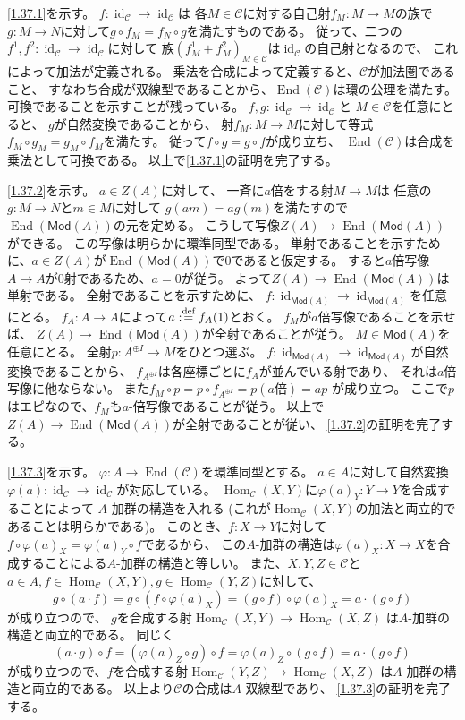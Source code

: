 \documentclass[uplatex,dvipdfmx]{jsarticle}
\makeatletter
\theoremstyle{definition}
\renewenvironment{proof}[1][\proofname]{
  \pushQED{\qed}%
  \normalfont \topsep6\p@\@plus6\p@\relax
  \trivlist
  \item[\hskip\labelsep
    #1\@addpunct{\textbf{.}}]\ignorespaces
}{%
  \popQED\endtrivlist\@endpefalse
}
\providecommand{\proofname}{証明}
\DeclareMathOperator{\Hom}{\mathrm{Hom}}
\DeclareMathOperator{\End}{\mathrm{End}}
\DeclareMathOperator{\id}{\mathrm{id}}
\newcommand{\Mod}{\mathsf{Mod}}
\newcommand\mcC{\mathcal{C}}
\def\dfn{:\overset{\mbox{{\scriptsize def}}}{=}}
\makeatother
\begin{document}
\begin{proof}
  \ref{1.37.1}を示す。
  \(f:\id_{\mcC}\to \id_{\mcC}\)は
  各\(M\in \mcC\)に対する自己射\(f_M:M\to M\)の族で
  \(g:M\to N\)に対して\(g\circ f_M = f_N\circ g\)を満たすものである。
  従って、二つの\(f^1,f^2:\id_{\mcC}\to \id_{\mcC}\)に対して
  族\((f^1_M+f^2_M)_{M\in \mcC}\)は\(\id_{\mcC}\)の自己射となるので、
  これによって加法が定義される。
  乗法を合成によって定義すると、\(\mcC\)が加法圏であること、
  すなわち合成が双線型であることから、\(\End(\mcC)\)は環の公理を満たす。
  可換であることを示すことが残っている。
  \(f,g:\id_{\mcC}\to \id_{\mcC}\)と
  \(M\in \mcC\)を任意にとると、
  \(g\)が自然変換であることから、
  射\(f_M:M\to M\)に対して等式\(f_M\circ g_M = g_M\circ f_M\)を満たす。
  従って\(f\circ g = g\circ f\)が成り立ち、
  \(\End(\mcC)\)は合成を乗法として可換である。
  以上で\ref{1.37.1}の証明を完了する。

  \ref{1.37.2}を示す。
  \(a\in Z(A)\)に対して、
  一斉に\(a\)倍をする射\(M\to M\)は
  任意の\(g:M\to N\)と\(m\in M\)に対して
  \(g(am) = ag(m)\)を満たすので
  \(\End(\Mod(A))\)の元を定める。
  こうして写像\(Z(A)\to \End(\Mod(A))\)ができる。
  この写像は明らかに環準同型である。
  単射であることを示すために、\(a\in Z(A)\)が\(\End(\Mod(A))\)で\(0\)であると仮定する。
  すると\(a\)倍写像\(A\to A\)が\(0\)射であるため、\(a=0\)が従う。
  よって\(Z(A)\to \End(\Mod(A))\)は単射である。
  全射であることを示すために、
  \(f:\id_{\Mod(A)}\to \id_{\Mod(A)}\)を任意にとる。
  \(f_A:A\to A\)によって\(a\dfn f_A(1)\)とおく。
  \(f_M\)が\(a\)倍写像であることを示せば、
  \(Z(A)\to \End(\Mod(A))\)が全射であることが従う。
  \(M\in \Mod(A)\)を任意にとる。
  全射\(p:A^{\oplus I}\to M\)をひとつ選ぶ。
  \(f:\id_{\Mod(A)}\to \id_{\Mod(A)}\)が自然変換であることから、
  \(f_{A^{\oplus I}}\)は各座標ごとに\(f_A\)が並んでいる射であり、
  それは\(a\)倍写像に他ならない。
  また\(f_M\circ p = p\circ f_{A^{\oplus I}} = p(a\text{倍}) = ap\)
  が成り立つ。
  ここで\(p\)はエピなので、\(f_M\)も\(a\)-倍写像であることが従う。
  以上で\(Z(A)\to \End(\Mod(A))\)が全射であることが従い、
  \ref{1.37.2}の証明を完了する。

  \ref{1.37.3}を示す。
  \(\varphi:A\to \End(\mcC)\)を環準同型とする。
  \(a\in A\)に対して自然変換\(\varphi(a):\id_{\mcC}\to \id_{\mcC}\)が対応している。
  \(\Hom_{\mcC}(X,Y)\)に\(\varphi(a)_Y:Y\to Y\)を合成することによって
  \(A\)-加群の構造を入れる
  (これが\(\Hom_{\mcC}(X,Y)\)の加法と両立的であることは明らかである)。
  このとき、\(f:X\to Y\)に対して
  \(f\circ \varphi(a)_X = \varphi(a)_Y\circ f\)であるから、
  この\(A\)-加群の構造は\(\varphi(a)_X:X\to X\)を合成することによる\(A\)-加群の構造と等しい。
  また、\(X,Y,Z\in \mcC\)と
  \(a\in A, f\in \Hom_{\mcC}(X,Y), g\in \Hom_{\mcC}(Y,Z)\)に対して、
  \[
  g\circ (a\cdot f) = g\circ (f\circ \varphi(a)_X)
  = (g\circ f)\circ \varphi(a)_X = a\cdot (g\circ f)
  \]
  が成り立つので、
  \(g\)を合成する射\(\Hom_{\mcC}(X,Y) \to \Hom_{\mcC}(X,Z)\)
  は\(A\)-加群の構造と両立的である。
  同じく
  \[
  (a\cdot g)\circ f = (\varphi(a)_Z\circ g) \circ f
  = \varphi(a)_Z\circ (g\circ f) = a\cdot (g\circ f)
  \]
  が成り立つので、\(f\)を合成する射\(\Hom_{\mcC}(Y,Z) \to \Hom_{\mcC}(X,Z)\)
  は\(A\)-加群の構造と両立的である。
  以上より\(\mcC\)の合成は\(A\)-双線型であり、
  \ref{1.37.3}の証明を完了する。


\end{proof}
\end{document}
